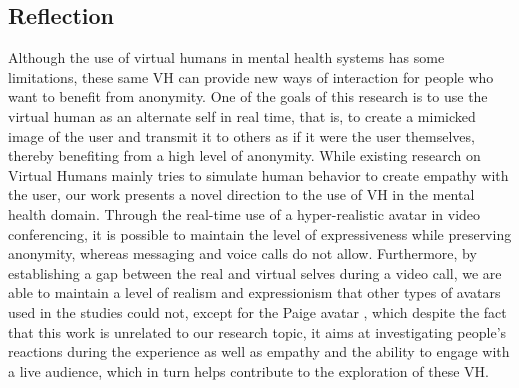 \subsection{Reflection}
Although the use of virtual humans in mental health systems has some limitations, these same VH can provide new ways of interaction for people who want to benefit from anonymity. One of the goals of this research is to use the virtual human as an alternate self in real time, that is, to create a mimicked image of the user and transmit it to others as if it were the user themselves, thereby benefiting from a high level of anonymity. While existing research on Virtual Humans mainly tries to simulate human behavior to create empathy with the user, our work presents a novel direction to the use of VH in the mental health domain. Through the real-time use of a hyper-realistic avatar in video conferencing, it is possible to maintain the level of expressiveness while preserving anonymity, whereas messaging and voice calls do not allow. Furthermore, by establishing a gap between the real and virtual selves during a video call, we are able to maintain a level of realism and expressionism that other types of avatars used in the studies could not, except for the Paige avatar \cite{ZEL19}, which despite the fact that this work is unrelated to our research topic, it aims at investigating people's reactions during the experience as well as empathy and the ability to engage with a live audience, which in turn helps contribute to the exploration of these VH.